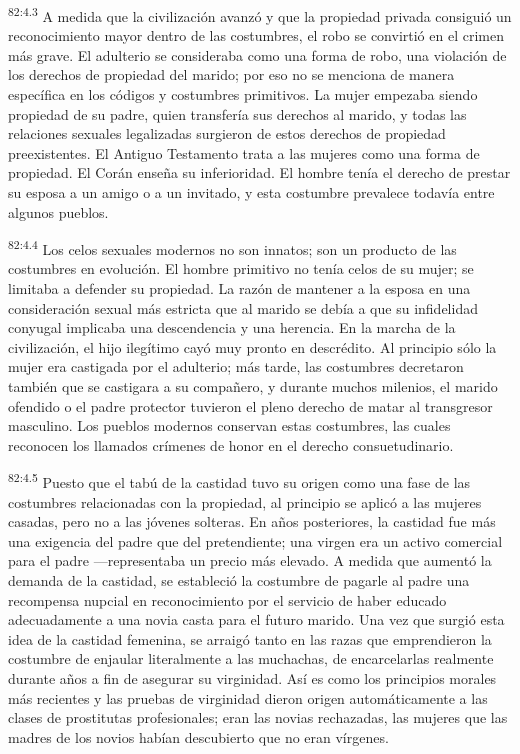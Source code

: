 \par
\textsuperscript{82:4.3} A medida que la civilización avanzó y que la propiedad privada consiguió un reconocimiento mayor dentro de las costumbres, el robo se convirtió en el crimen más grave. El adulterio se consideraba como una forma de robo, una violación de los derechos de propiedad del marido; por eso no se menciona de manera específica en los códigos y costumbres primitivos. La mujer empezaba siendo propiedad de su padre, quien transfería sus derechos al marido, y todas las relaciones sexuales legalizadas surgieron de estos derechos de propiedad preexistentes. El Antiguo Testamento trata a las mujeres como una forma de propiedad. El Corán enseña su inferioridad. El hombre tenía el derecho de prestar su esposa a un amigo o a un invitado, y esta costumbre prevalece todavía entre algunos pueblos.

\par
\textsuperscript{82:4.4} Los celos sexuales modernos no son innatos; son un producto de las costumbres en evolución. El hombre primitivo no tenía celos de su mujer; se limitaba a defender su propiedad. La razón de mantener a la esposa en una consideración sexual más estricta que al marido se debía a que su infidelidad conyugal implicaba una descendencia y una herencia. En la marcha de la civilización, el hijo ilegítimo cayó muy pronto en descrédito. Al principio sólo la mujer era castigada por el adulterio; más tarde, las costumbres decretaron también que se castigara a su compañero, y durante muchos milenios, el marido ofendido o el padre protector tuvieron el pleno derecho de matar al transgresor masculino. Los pueblos modernos conservan estas costumbres, las cuales reconocen los llamados crímenes de honor en el derecho consuetudinario.

\par
\textsuperscript{82:4.5} Puesto que el tabú de la castidad tuvo su origen como una fase de las costumbres relacionadas con la propiedad, al principio se aplicó a las mujeres casadas, pero no a las jóvenes solteras. En años posteriores, la castidad fue más una exigencia del padre que del pretendiente; una virgen era un activo comercial para el padre ---representaba un precio más elevado. A medida que aumentó la demanda de la castidad, se estableció la costumbre de pagarle al padre una recompensa nupcial en reconocimiento por el servicio de haber educado adecuadamente a una novia casta para el futuro marido. Una vez que surgió esta idea de la castidad femenina, se arraigó tanto en las razas que emprendieron la costumbre de enjaular literalmente a las muchachas, de encarcelarlas realmente durante años a fin de asegurar su virginidad. Así es como los principios morales más recientes y las pruebas de virginidad dieron origen automáticamente a las clases de prostitutas profesionales; eran las novias rechazadas, las mujeres que las madres de los novios habían descubierto que no eran vírgenes.

